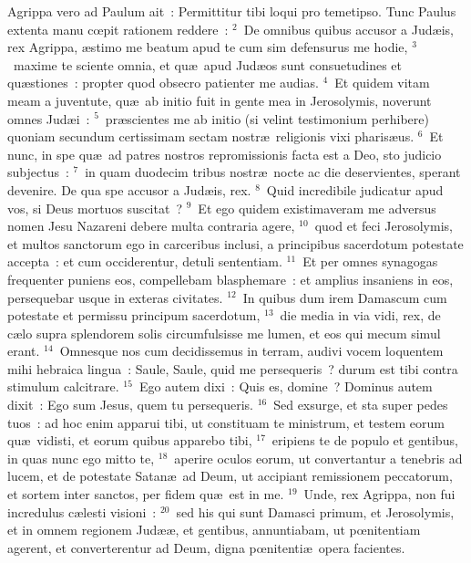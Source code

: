 \lettrine[lines=3,image=true,loversize=0.05,lraise=-0.03]{A}{}grippa vero ad Paulum ait~: Permittitur tibi loqui pro temetipso. Tunc Paulus extenta manu cœpit rationem reddere~:
${}^{2}$~De omnibus quibus accusor a Jud\ae is, rex Agrippa, \ae stimo me beatum apud te cum sim defensurus me hodie,
${}^{3}$~maxime te sciente omnia, et qu\ae\ apud Jud\ae os sunt consuetudines et qu\ae stiones~: propter quod obsecro patienter me audias.
${}^{4}$~Et quidem vitam meam a juventute, qu\ae\ ab initio fuit in gente mea in Jerosolymis, noverunt omnes Jud\ae i~:
${}^{5}$~pr\ae scientes me ab initio (si velint testimonium perhibere) quoniam secundum certissimam sectam nostr\ae\ religionis vixi pharis\ae us.
${}^{6}$~Et nunc, in spe qu\ae\ ad patres nostros repromissionis facta est a Deo, sto judicio subjectus~:
${}^{7}$~in quam duodecim tribus nostr\ae\ nocte ac die deservientes, sperant devenire. De qua spe accusor a Jud\ae is, rex.
${}^{8}$~Quid incredibile judicatur apud vos, si Deus mortuos suscitat~?
${}^{9}$~Et ego quidem existimaveram me adversus nomen Jesu Nazareni debere multa contraria agere,
${}^{10}$~quod et feci Jerosolymis, et multos sanctorum ego in carceribus inclusi, a principibus sacerdotum potestate accepta~: et cum occiderentur, detuli sententiam.
${}^{11}$~Et per omnes synagogas frequenter puniens eos, compellebam blasphemare~: et amplius insaniens in eos, persequebar usque in exteras civitates.
${}^{12}$~In quibus dum irem Damascum cum potestate et permissu principum sacerdotum,
${}^{13}$~die media in via vidi, rex, de c\ae lo supra splendorem solis circumfulsisse me lumen, et eos qui mecum simul erant.
${}^{14}$~Omnesque nos cum decidissemus in terram, audivi vocem loquentem mihi hebraica lingua~: Saule, Saule, quid me persequeris~? durum est tibi contra stimulum calcitrare.
${}^{15}$~Ego autem dixi~: Quis es, domine~? Dominus autem dixit~: Ego sum Jesus, quem tu persequeris.
${}^{16}$~Sed exsurge, et sta super pedes tuos~: ad hoc enim apparui tibi, ut constituam te ministrum, et testem eorum qu\ae\ vidisti, et eorum quibus apparebo tibi,
${}^{17}$~eripiens te de populo et gentibus, in quas nunc ego mitto te,
${}^{18}$~aperire oculos eorum, ut convertantur a tenebris ad lucem, et de potestate Satan\ae\ ad Deum, ut accipiant remissionem peccatorum, et sortem inter sanctos, per fidem qu\ae\ est in me.
${}^{19}$~Unde, rex Agrippa, non fui incredulus c\ae lesti visioni~:
${}^{20}$~sed his qui sunt Damasci primum, et Jerosolymis, et in omnem regionem Jud\ae \ae , et gentibus, annuntiabam, ut pœnitentiam agerent, et converterentur ad Deum, digna pœnitenti\ae\ opera facientes.
